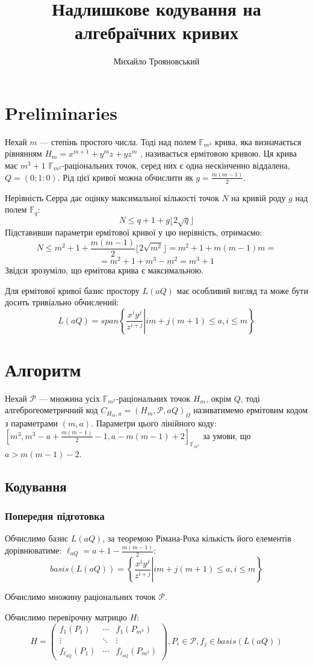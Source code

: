 \documentclass[a4paper,12pt,oneside]{article}
\title{Надлишкове кодування на алгебраїчних кривих}
\author{Михайло Трояновський}
\begin{document}
\section{Preliminaries}
Нехай $m$ --- степінь простого числа. Тоді над полем $\mathbb{F}_{m^2}$ крива, яка визначається рівнянням $H_m = x^{m+1} + y^m z + y z^m$ ,
називається ермітовою кривою. Ця крива має $m^3+1$ $\mathbb{F}_{m^2}$-раціональних точок, серед них є одна нескінченно віддалена, 
$Q = (0:1:0)$. Рід цієї кривої можна обчислити як $g = \frac{m(m-1)}{2}$.

Нерівність Серра дає оцінку максимальної кількості точок $N$ на кривій роду $g$ над полем $\mathbb{F}_q$:
$$ N \le q+1+g \lfloor 2 \sqrt{q} \rfloor $$
Підставивши параметри ермітової кривої у цю нерівність, отримаємо:
$$ N \le m^2 + 1 + \frac{m(m-1)}{2} \lfloor 2 \sqrt{m^2} \rfloor= m^2 + 1 + m(m-1)m = $$
$$ = m^2 + 1 + m^3 - m^2 = m^3 + 1$$
Звідси зрозуміло, що ермітова крива є максимальною.

Для ермітової кривої базис простору $L(aQ)$ має особливий вигляд та може бути досить тривіально обчислений:
$$ L(aQ) = span \left. \left \{ \frac{x^i y^j}{z^{i+j}} \right | i m + j (m + 1) \le a, i \le m \right \} $$


\section{Алгоритм}
Нехай $\mathcal{P}$ --- множина усіх $\mathbb{F}_{m^2}$-раціональних точок $H_m$, окрім $Q$, тоді алгеброгеометричний код 
$C_{H_{m}, a} = (H_m, \mathcal{P}, aQ)_\Omega$ називатимемо ермітовим кодом з параметрами $(m, a)$. Параметри цього лінійного коду:
$[m^3, m^3 - a + \frac{m(m-1)}{2} - 1, a - m(m-1) + 2]_{\mathbb{F}_{m^2}}$ за умови, що $ a > m(m-1) - 2$.
\subsection{Кодування}
\subsubsection{Попередня підготовка}
Обчислимо базис $L(aQ)$, за теоремою Рімана-Роха кількість його елементів дорівнюватиме: $\ell_{aQ}=a+1-\frac{m(m-1)}{2}$:
$$ basis(L(aQ)) = \left. \left \{ \frac{x^i y^j}{z^{i+j}} \right | i m + j (m + 1) \le a, i \le m \right \} $$

Обчислимо множину раціональних точок $\mathcal{P}$.

Обчислимо перевірочну матрицю $H$:
$$ 
H = 
\begin{pmatrix}
 f_1 (P_1) & \cdots & f_1(P_{m^3}) \\
 \vdots & \ddots & \vdots \\
 f_{\ell_{aQ}} (P_1) & \cdots & f_{\ell_{aQ}}(P_{m^3})
\end{pmatrix}, P_i \in \mathcal{P}, f_j \in basis(L(aQ))
$$
\end{document}
